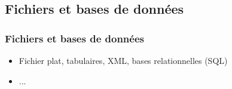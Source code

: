\documentclass{beamer}
\begin{document}

\def\titleSection1Subsection4{Fichiers et bases de donn{\'e}es}
\subsection{ \titleSection1Subsection4 }
\begin{frame}
	\frametitle{ \titleSection1Subsection4 }
	\begin{itemize}
		\item Fichier plat, tabulaires, XML, bases relationnelles (SQL)
		\item ... 
	\end{itemize}
\end{frame}
\end{document}
